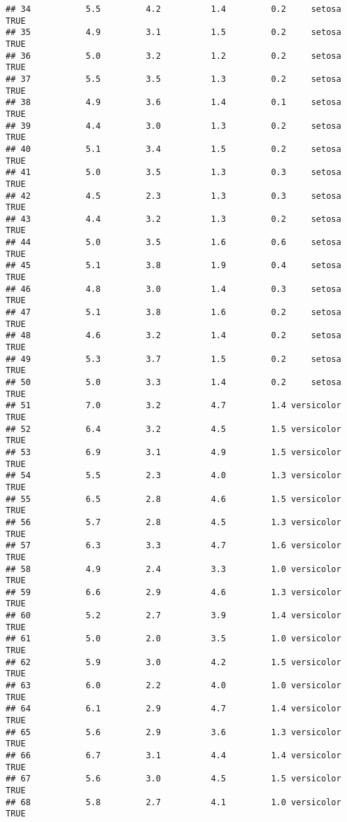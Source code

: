 \documentclass[]{article}
\begin{document}
\begin{verbatim}
## 34           5.5         4.2          1.4         0.2     setosa   TRUE
## 35           4.9         3.1          1.5         0.2     setosa   TRUE
## 36           5.0         3.2          1.2         0.2     setosa   TRUE
## 37           5.5         3.5          1.3         0.2     setosa   TRUE
## 38           4.9         3.6          1.4         0.1     setosa   TRUE
## 39           4.4         3.0          1.3         0.2     setosa   TRUE
## 40           5.1         3.4          1.5         0.2     setosa   TRUE
## 41           5.0         3.5          1.3         0.3     setosa   TRUE
## 42           4.5         2.3          1.3         0.3     setosa   TRUE
## 43           4.4         3.2          1.3         0.2     setosa   TRUE
## 44           5.0         3.5          1.6         0.6     setosa   TRUE
## 45           5.1         3.8          1.9         0.4     setosa   TRUE
## 46           4.8         3.0          1.4         0.3     setosa   TRUE
## 47           5.1         3.8          1.6         0.2     setosa   TRUE
## 48           4.6         3.2          1.4         0.2     setosa   TRUE
## 49           5.3         3.7          1.5         0.2     setosa   TRUE
## 50           5.0         3.3          1.4         0.2     setosa   TRUE
## 51           7.0         3.2          4.7         1.4 versicolor   TRUE
## 52           6.4         3.2          4.5         1.5 versicolor   TRUE
## 53           6.9         3.1          4.9         1.5 versicolor   TRUE
## 54           5.5         2.3          4.0         1.3 versicolor   TRUE
## 55           6.5         2.8          4.6         1.5 versicolor   TRUE
## 56           5.7         2.8          4.5         1.3 versicolor   TRUE
## 57           6.3         3.3          4.7         1.6 versicolor   TRUE
## 58           4.9         2.4          3.3         1.0 versicolor   TRUE
## 59           6.6         2.9          4.6         1.3 versicolor   TRUE
## 60           5.2         2.7          3.9         1.4 versicolor   TRUE
## 61           5.0         2.0          3.5         1.0 versicolor   TRUE
## 62           5.9         3.0          4.2         1.5 versicolor   TRUE
## 63           6.0         2.2          4.0         1.0 versicolor   TRUE
## 64           6.1         2.9          4.7         1.4 versicolor   TRUE
## 65           5.6         2.9          3.6         1.3 versicolor   TRUE
## 66           6.7         3.1          4.4         1.4 versicolor   TRUE
## 67           5.6         3.0          4.5         1.5 versicolor   TRUE
## 68           5.8         2.7          4.1         1.0 versicolor   TRUE

\end{verbatim}
\end{document}

